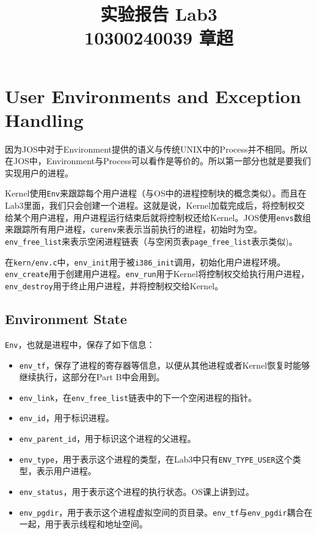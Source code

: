 \documentclass[11pt]{article}
\begin{document}
\title{\textbf{\huge{实验报告 Lab3}}\\
10300240039 章超}
\maketitle
\section{User Environments and Exception Handling}

因为JOS中对于Environment提供的语义与传统UNIX中的Process并不相同。所以在JOS中，Environment与Process可以看作是等价的。所以第一部分也就是要我们实现用户的进程。

Kernel使用\lstinline|Env|来跟踪每个用户进程（与OS中的进程控制块的概念类似）。而且在Lab3里面，我们只会创建一个进程。这就是说，Kernel加载完成后，将控制权交给某个用户进程，用户进程运行结束后就将控制权还给Kernel。JOS使用\lstinline|envs|数组来跟踪所有用户进程，\lstinline|curenv|来表示当前执行的进程，初始时为空。\lstinline|env_free_list|来表示空闲进程链表（与空闲页表\lstinline|page_free_list|表示类似)。

在\lstinline|kern/env.c|中，\lstinline|env_init|用于被\lstinline|i386_init|调用，初始化用户进程环境。\lstinline|env_create|用于创建用户进程。\lstinline|env_run|用于Kernel将控制权交给执行用户进程，\lstinline|env_destroy|用于终止用户进程，并将控制权交给Kernel。

\subsection{Environment State}

\lstinline|Env|，也就是进程中，保存了如下信息：
\begin{itemize}
\item \lstinline|env_tf|，保存了进程的寄存器等信息，以便从其他进程或者Kernel恢复时能够继续执行，这部分在Part B中会用到。
\item \lstinline|env_link|，在\lstinline|env_free_list|链表中的下一个空闲进程的指针。
\item \lstinline|env_id|，用于标识进程。
\item \lstinline|env_parent_id|，用于标识这个进程的父进程。
\item \lstinline|env_type|，用于表示这个进程的类型，在Lab3中只有\lstinline|ENV_TYPE_USER|这个类型，表示用户进程。
\item \lstinline|env_status|，用于表示这个进程的执行状态。OS课上讲到过。
\item \lstinline|env_pgdir|，用于表示这个进程虚拟空间的页目录。\lstinline|env_tf|与\lstinline|env_pgdir|耦合在一起，用于表示线程和地址空间。
\end{itemize}
\end{document}
